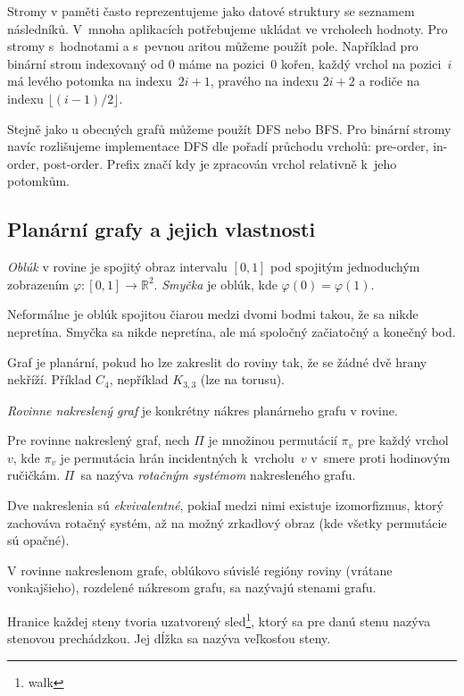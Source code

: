 Stromy v paměti často reprezentujeme jako datové struktury se seznamem
následníků. V~mnoha aplikacích potřebujeme ukládat ve vrcholech hodnoty.
Pro stromy s~hodnotami a s~pevnou aritou můžeme použít pole.
Například pro binární strom indexovaný od 0 máme na pozici~$0$ kořen,
každý vrchol na pozici~$i$ má levého potomka na indexu~$2i+1$, pravého
na indexu $2i+2$ a rodiče na indexu $\lfloor (i - 1) / 2 \rfloor$.

Stejně jako u obecných grafů můžeme použít DFS nebo BFS. Pro binární
stromy navíc rozlišujeme implementace DFS dle pořadí průchodu vrcholů:
pre-order, in-order, post-order. Prefix značí kdy je zpracován vrchol
relativně k~jeho potomkům.

\subsection{Planární grafy a jejich vlastnosti}

\begin{definition}
	{\em Oblúk} v rovine je spojitý obraz intervalu $[0,1]$ pod spojitým
	jednoduchým zobrazením $\varphi: [0,1] \to \mathbb{R}^2$. 
	{\em Smyčka} je oblúk, kde $\varphi(0)=\varphi(1)$.
\end{definition}
Neformálne je oblúk spojitou čiarou medzi dvomi bodmi takou, že sa
nikde nepretína. Smyčka sa nikde nepretína, ale má spoločný začiatočný
a konečný bod.

Graf je planární, pokud ho lze zakreslit do roviny tak, že se žádné dvě
hrany nekříží. Příklad $C_4$, nepříklad $K_{3,3}$ (lze na torusu).

{\em Rovinne nakreslený graf} je konkrétny nákres planárneho grafu v rovine.

\begin{definition}
	Pre rovinne nakreslený graf, nech $\Pi$ je množinou permutácií $\pi_v$
	pre každý vrchol $v$, kde $\pi_v$ je permutácia hrán incidentných 
	k~vrcholu~$v$ v~smere proti hodinovým ručičkám. $\Pi$~sa nazýva {\em rotačným
	systémom} nakresleného grafu.
	
	Dve nakreslenia sú {\em ekvivalentné}, pokiaľ medzi nimi existuje izomorfizmus,
	ktorý zachováva rotačný systém, až na možný zrkadlový obraz (kde všetky permutácie
	sú opačné).
\end{definition}

\begin{definition}[Stena]
	V rovinne nakreslenom grafe, oblúkovo súvislé regióny roviny (vrátane vonkajšieho),
	rozdelené nákresom grafu, sa nazývajú stenami grafu.
	
	Hranice každej steny tvoria uzatvorený sled\footnote{walk}, ktorý sa pre
	danú stenu nazýva stenovou prechádzkou. Jej dĺžka sa nazýva veľkosťou steny.
\end{definition}

